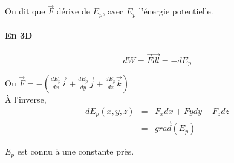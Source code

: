 	On dit que $\vec{F}$ dérive de $E_p$, avec $E_p$ l'énergie potentielle.

\paragraph{En 3D} \[dW = \vec{F}\vec{dl} = -dE_p\]

Ou $\vec{F} = -(\frac{dE_p}{dx}\vec{i} + \frac{dE_p}{dy}\vec{j} + \frac{dE_p}{dz}\vec{k})$ ~\\
À l'inverse, \[\begin{array}{rcl}
		dE_p(x, y, z) &=& F_xdx + Fy dy + F_z dz \\
												 &=& \overrightarrow{grad}(E_p)
\end{array}\]

$E_p$ est connu à une constante près.
